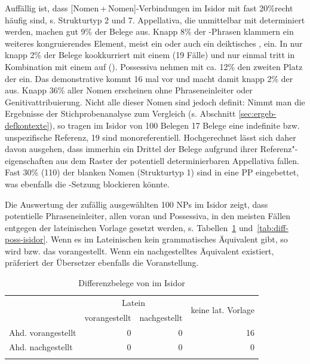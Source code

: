 Auffällig ist, dass [Nomen\,+\,Nomen]-Verbindungen im Isidor mit fast 20\%\linebreak recht häufig sind, s. Strukturtyp 2 und 7.  Appellativa, die unmittelbar mit  determiniert werden, machen gut 9\% der Belege aus. Knapp 8\% der -Phrasen  klammern  ein weiteres kongruierendes Element, meist ein  oder auch ein deiktisches , ein. In nur knapp 2\% der Belege kookkurriert  mit einem  (19 Fälle) und nur einmal tritt  in Kombination mit einem  auf (). Possessiva  nehmen mit ca. 12\% den zweiten Platz der  ein. Das demonstrative  kommt 16 mal vor und macht damit  knapp 2\% der  aus. Knapp 36\% aller Nomen erscheinen ohne Phraseneinleiter oder  Genitivattribuierung. Nicht alle dieser Nomen sind jedoch definit:  Nimmt man die Ergebnisse der Stichprobenanalyse zum Vergleich (s. Abschnitt \ref{sec:ergeb-defkontexte}), so tragen im Isidor von 100 Belegen 17 Belege eine indefinite   bzw. unspezifische  Referenz, 19 sind monoreferentiell. Hochgerechnet lässt sich daher davon ausgehen, dass immerhin ein Drittel der Belege aufgrund ihrer Referenz"-eigenschaften aus dem Raster der potentiell determinierbaren  Appellativa fallen. Fast 30\% (110) der blanken Nomen (Strukturtyp 1) sind in eine PP eingebettet, was ebenfalls die -Setzung blockieren könnte. 

Die Auswertung der zufällig ausgewählten 100 NPs im Isidor zeigt, dass potentielle Phraseneinleiter, allen voran  und  Possessiva, in den meisten Fällen entgegen der lateinischen Vorlage gesetzt werden, s. Tabellen~\ref{tab:diff-ther-isidor} und~\ref{tab:diff-poss-isidor}. Wenn es im Lateinischen kein grammatisches Äquivalent gibt, so wird  bzw. das  vorangestellt. Wenn ein nachgestelltes Äquivalent existiert, präferiert der Übersetzer ebenfalls die Voranstellung.

\begin{table}
\centering
\begin{tabular}{lrrr}
\lsptoprule
                   & \multicolumn{2}{c}{Latein} & \multirow{2}{*}{keine lat. Vorlage}\\
 \cmidrule(lr){2-3}
                   & vorangestellt & nachgestellt & \\ \midrule
Ahd. vorangestellt & 0                  & 0                 & 16                    \\
Ahd. nachgestellt  & 0                  & 0                 & 0                    \\ \lspbottomrule
\end{tabular}
\caption{Differenzbelege  von  im Isidor}
\label{tab:diff-ther-isidor}
\end{table}

